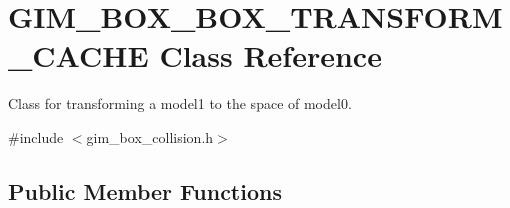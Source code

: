 \hypertarget{classGIM__BOX__BOX__TRANSFORM__CACHE}{}\section{G\+I\+M\+\_\+\+B\+O\+X\+\_\+\+B\+O\+X\+\_\+\+T\+R\+A\+N\+S\+F\+O\+R\+M\+\_\+\+C\+A\+C\+HE Class Reference}
\label{classGIM__BOX__BOX__TRANSFORM__CACHE}


Class for transforming a model1 to the space of model0.  




{\ttfamily \#include $<$gim\+\_\+box\+\_\+collision.\+h$>$}

\subsection*{Public Member Functions}
